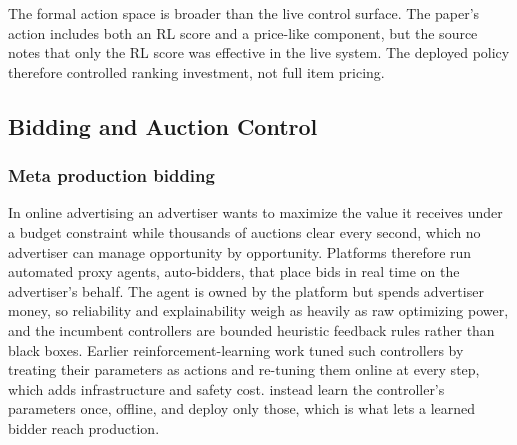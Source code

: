 The formal action space is broader than the live control surface. The paper's action includes both an RL score and a price-like component, but the source notes that only the RL score was effective in the live system. The deployed policy therefore controlled ranking investment, not full item pricing.

\subsection{Bidding and Auction Control}

\subsubsection{Meta production bidding}
In online advertising an advertiser wants to maximize the value it receives under a budget constraint while thousands of auctions clear every second, which no advertiser can manage opportunity by opportunity. Platforms therefore run automated proxy agents, auto-bidders, that place bids in real time on the advertiser's behalf. The agent is owned by the platform but spends advertiser money, so reliability and explainability weigh as heavily as raw optimizing power, and the incumbent controllers are bounded heuristic feedback rules rather than black boxes. Earlier reinforcement-learning work tuned such controllers by treating their parameters as actions and re-tuning them online at every step, which adds infrastructure and safety cost. \citet{Korenkevych2023MetaBidding} instead learn the controller's parameters once, offline, and deploy only those, which is what lets a learned bidder reach production.

